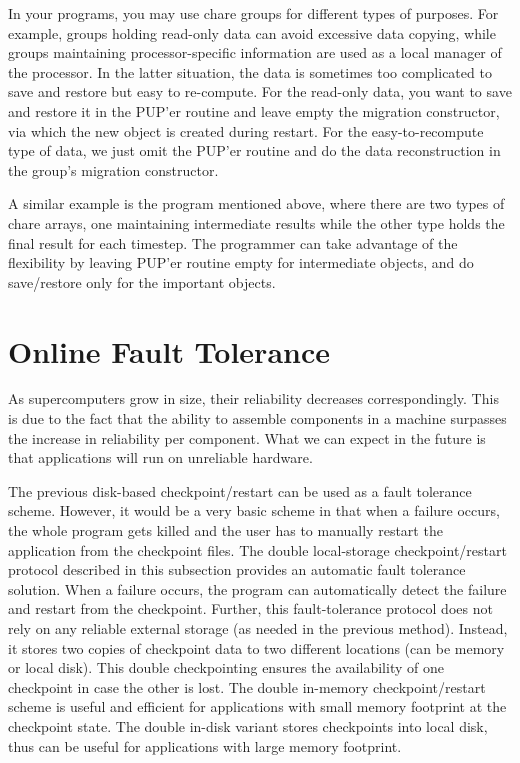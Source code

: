 In your programs, you may use chare groups for different types of
purposes.  For example, groups holding read-only data can avoid
excessive data copying, while groups maintaining processor-specific
information are used as a local manager of the processor. In the
latter situation, the data is sometimes too complicated to save and
restore but easy to re-compute. For the read-only data, you want to
save and restore it in the PUP'er routine and leave empty the
migration constructor, via which the new object is created during
restart.  For the easy-to-recompute type of data, we just omit the
PUP'er routine and do the data reconstruction in the group's migration
constructor.

A similar example is the program mentioned above, where there are two
types of chare arrays, one maintaining intermediate results while the
other type holds the final result for each timestep. The programmer
can take advantage of the flexibility by leaving PUP'er routine empty
for intermediate objects, and do save/restore only for the important
objects.

\section{Online Fault Tolerance}
\label{sec:MemCheckpointing}
As supercomputers grow in size, their reliability decreases
correspondingly. This is due to the fact that the ability to assemble
components in a machine surpasses the increase in reliability per
component. What we can expect in the future is that applications will
run on unreliable hardware.

The previous disk-based checkpoint/restart can be used as a fault
tolerance scheme. However, it would be a very basic scheme in that
when a failure occurs, the whole program gets killed and the user has
to manually restart the application from the checkpoint files.  The
double local-storage checkpoint/restart protocol described in this
subsection provides an automatic fault tolerance solution. When a
failure occurs, the program can automatically detect the failure and
restart from the checkpoint.  Further, this fault-tolerance protocol
does not rely on any reliable external storage (as needed in the previous
method).  Instead, it stores two copies of checkpoint data to two
different locations (can be memory or local disk).  This double
checkpointing ensures the availability of one checkpoint in case the
other is lost.  The double in-memory checkpoint/restart scheme is
useful and efficient for applications with small memory footprint at
the checkpoint state.  The double in-disk variant stores checkpoints
into local disk, thus can be useful for applications with large memory
footprint.



